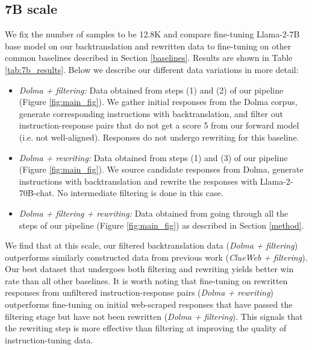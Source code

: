 \subsection{7B scale}
We fix the number of samples to be 12.8K and compare fine-tuning Llama-2-7B base model on our backtranslation and rewritten data to fine-tuning on other common baselines described in Section \ref{baselines}. Results are shown in Table \ref{tab:7b_results}.
Below we describe our different data variations in more detail:
\begin{itemize}[topsep=0pt, itemsep=0pt, leftmargin=8pt, parsep=2pt]
\item \textit{Dolma + filtering:} Data obtained from steps (1) and (2) of our pipeline (Figure \ref{fig:main_fig}). We gather initial responses from the Dolma corpus, generate corresponding instructions with backtranslation, and filter out instruction-response pairs that do not get a score 5 from our forward model (i.e. not well-aligned). Responses do not undergo rewriting for this baseline.
\item \textit{Dolma + rewriting:} Data obtained from steps (1) and (3) of our pipeline (Figure \ref{fig:main_fig}). We source candidate responses from Dolma, generate instructions with backtranslation and rewrite the responses with Llama-2-70B-chat. No intermediate filtering is done in this case.
\item \textit{Dolma + filtering + rewriting:} Data obtained from going through all the steps of our pipeline (Figure \ref{fig:main_fig}) as described in Section \ref{method}.
\end{itemize}
We find that at this scale, our filtered backtranslation data (\textit{Dolma + filtering}) outperforms similarly constructed data from previous work \cite{li2023self} (\textit{ClueWeb + filtering}). Our best dataset that undergoes both filtering and rewriting yields better win rate than all other baselines. It is worth noting that fine-tuning on rewritten responses from unfiltered instruction-response pairs (\textit{Dolma + rewriting}) outperforms fine-tuning on initial web-scraped responses that have passed the filtering stage but have not been rewritten (\textit{Dolma + filtering}). This signals that the rewriting step is more effective than filtering at improving the quality of instruction-tuning data.
